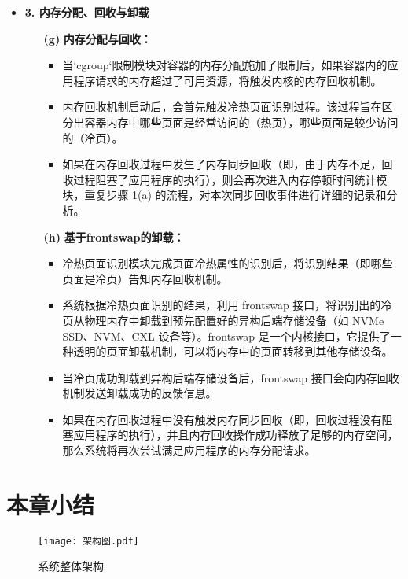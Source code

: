 \begin{itemize}
    \item \textbf{3. 内存分配、回收与卸载}
    \begin{itemize}
        \item[\textbf{(g)}] \textbf{内存分配与回收：}
        \begin{itemize}
            \item  当`cgroup`限制模块对容器的内存分配施加了限制后，如果容器内的应用程序请求的内存超过了可用资源，将触发内核的内存回收机制。
            \item 内存回收机制启动后，会首先触发冷热页面识别过程。该过程旨在区分出容器内存中哪些页面是经常访问的（热页），哪些页面是较少访问的（冷页）。
            \item 如果在内存回收过程中发生了内存同步回收（即，由于内存不足，回收过程阻塞了应用程序的执行），则会再次进入内存停顿时间统计模块，重复步骤 1(a) 的流程，对本次同步回收事件进行详细的记录和分析。
        \end{itemize}
        \item[\textbf{(h)}] \textbf{基于frontswap的卸载：}
        \begin{itemize}
            \item 冷热页面识别模块完成页面冷热属性的识别后，将识别结果（即哪些页面是冷页）告知内存回收机制。
            \item 系统根据冷热页面识别的结果，利用 frontswap 接口，将识别出的冷页从物理内存中卸载到预先配置好的异构后端存储设备（如 NVMe SSD、NVM、CXL 设备等）。frontswap 是一个内核接口，它提供了一种透明的页面卸载机制，可以将内存中的页面转移到其他存储设备。
            \item 当冷页成功卸载到异构后端存储设备后，frontswap 接口会向内存回收机制发送卸载成功的反馈信息。
            \item 如果在内存回收过程中没有触发内存同步回收（即，回收过程没有阻塞应用程序的执行），并且内存回收操作成功释放了足够的内存空间，那么系统将再次尝试满足应用程序的内存分配请求。
        \end{itemize}
    \end{itemize}
\end{itemize}


\section{本章小结}


\begin{figure}[h]
    \centering
    \texttt{[image: 架构图.pdf]}
    \caption{系统整体架构}
    \label{fig:system_architecture}
\end{figure}


